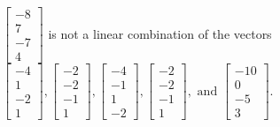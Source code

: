\begin{exercise}
\begin{exerciseStatement}
  \end{exerciseStatement}
  \begin{exerciseAnswer}
   \(\left[\begin{array}{c}
-8 \\
7 \\
-7 \\
4
\end{array}\right]\) 
  	 is not  
	a linear combination of the vectors \(\left[\begin{array}{c}
-4 \\
1 \\
-2 \\
1
\end{array}\right] , \left[\begin{array}{c}
-2 \\
-2 \\
-1 \\
1
\end{array}\right] , \left[\begin{array}{c}
-4 \\
-1 \\
1 \\
-2
\end{array}\right] , \left[\begin{array}{c}
-2 \\
-2 \\
-1 \\
1
\end{array}\right] , \text{ and } \left[\begin{array}{c}
-10 \\
0 \\
-5 \\
3
\end{array}\right]\).

	
  


  \end{exerciseAnswer}
\end{exercise}